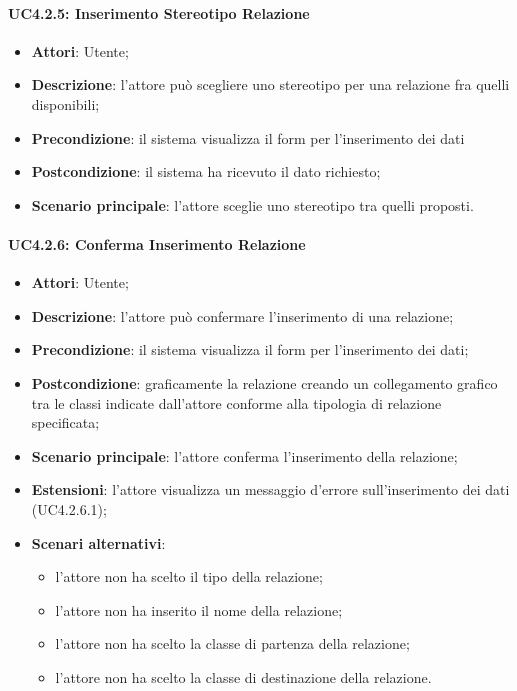 \paragraph{UC4.2.5: Inserimento Stereotipo Relazione}
\label{UC4.2.5}
\begin{itemize}
	\item \textbf{Attori}: Utente;
	\item \textbf{Descrizione}: l'attore può scegliere uno stereotipo per una relazione fra quelli disponibili;
	\item \textbf{Precondizione}: il sistema visualizza il form per l'inserimento dei dati
	\item \textbf{Postcondizione}: il sistema ha ricevuto il dato richiesto;
	\item \textbf{Scenario principale}: l'attore sceglie uno stereotipo tra quelli proposti.
\end{itemize}

\paragraph{UC4.2.6: Conferma Inserimento Relazione}
\label{UC4.2.6}
\begin{itemize}
	\item \textbf{Attori}: Utente;
	\item \textbf{Descrizione}: l'attore può confermare l'inserimento di una relazione;
	\item \textbf{Precondizione}: il sistema visualizza il form per l'inserimento dei dati;
	\item \textbf{Postcondizione}: graficamente la relazione creando un collegamento grafico tra le classi indicate dall'attore conforme alla tipologia di relazione specificata;
	\item \textbf{Scenario principale}: l'attore conferma l'inserimento della relazione;
	\item \textbf{Estensioni}: l'attore visualizza un messaggio d'errore sull'inserimento dei dati (UC4.2.6.1);
	\item \textbf{Scenari alternativi}:
	\begin{itemize}
		\item l'attore non ha scelto il tipo della relazione;
		\item l'attore non ha inserito il nome della relazione;
		\item l'attore non ha scelto la classe di partenza della relazione;
		\item l'attore non ha scelto la classe di destinazione della relazione.
	\end{itemize}
\end{itemize}

